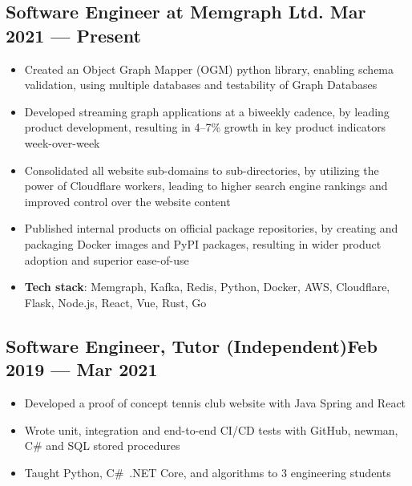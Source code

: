 \documentclass{article}
\begin{document}
\subsection{Software Engineer at Memgraph Ltd. \hfill Mar 2021 --- Present}
\begin{itemize}
  \itemsep0em
  \item Created an Object Graph Mapper (OGM) python library, enabling schema validation, using multiple databases and testability of Graph Databases
  \item Developed streaming graph applications at a biweekly cadence, by leading product development, resulting in 4--7\% growth in key product indicators week-over-week
  \item Consolidated all website sub-domains to sub-directories, by utilizing the power of Cloudflare workers, leading to higher search engine rankings and improved control over the website content
  \item Published internal products on official package repositories, by creating and packaging Docker images and PyPI packages, resulting in wider product adoption and superior ease-of-use
  \item {\bfseries Tech stack}: Memgraph, Kafka, Redis, Python, Docker, AWS, Cloudflare, Flask, Node.js, React, Vue, Rust, Go
\end{itemize}

\subsection{Software Engineer, Tutor (Independent)\hfill Feb 2019 --- Mar 2021}
\begin{itemize}
  \itemsep0em
  \item Developed a proof of concept tennis club website with Java Spring and React
  \item Wrote unit, integration and end-to-end CI/CD tests with GitHub, newman, C\# and SQL stored procedures
  \item Taught Python, C\#~.NET Core, and algorithms to 3 engineering students
\end{itemize}
\end{document}
